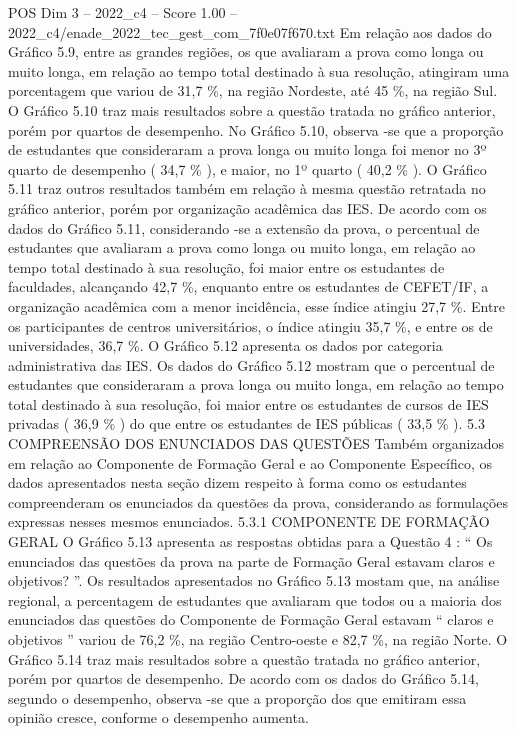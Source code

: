 \begin{textsample}{POS Dim 3 – 2022\_c4 – Score 1.00 – 2022\_c4/enade\_2022\_tec\_gest\_com\_7f0e07f670.txt}
Em relação aos dados do Gráfico 5.9, entre as grandes regiões, os que avaliaram a prova como longa ou muito longa, em relação ao tempo total destinado à sua resolução, atingiram uma porcentagem que variou de 31,7 \%, na região Nordeste, até 45 \%, na região Sul.
O Gráfico 5.10 traz mais resultados sobre a questão tratada no gráfico anterior, porém por quartos de desempenho.
No Gráfico 5.10, observa -se que a proporção de estudantes que consideraram a prova longa ou muito longa foi menor no 3º quarto de desempenho ( 34,7 \% ), e maior, no 1º quarto ( 40,2 \% ).
O Gráfico 5.11 traz outros resultados também em relação à mesma questão retratada no gráfico anterior, porém por organização acadêmica das IES.
De acordo com os dados do Gráfico 5.11, considerando -se a extensão da prova, o percentual de estudantes que avaliaram a prova como longa ou muito longa, em relação ao tempo total destinado à sua resolução, foi maior entre os estudantes de faculdades, alcançando 42,7 \%, enquanto entre os estudantes de CEFET/IF, a organização acadêmica com a menor incidência, esse índice atingiu 27,7 \%.
Entre os participantes de centros universitários, o índice atingiu 35,7 \%, e entre os de universidades, 36,7 \%.
O Gráfico 5.12 apresenta os dados por categoria administrativa das IES.
Os dados do Gráfico 5.12 mostram que o percentual de estudantes que consideraram a prova longa ou muito longa, em relação ao tempo total destinado à sua resolução, foi maior entre os estudantes de cursos de IES privadas ( 36,9 \% ) do que entre os estudantes de IES públicas ( 33,5 \% ). 5.3 COMPREENSÃO DOS ENUNCIADOS DAS QUESTÕES Também organizados em relação ao Componente de Formação Geral e ao Componente Específico, os dados apresentados nesta seção dizem respeito à forma como os estudantes compreenderam os enunciados da questões da prova, considerando as formulações expressas nesses mesmos enunciados. 5.3.1 COMPONENTE DE FORMAÇÃO GERAL O Gráfico 5.13 apresenta as respostas obtidas para a Questão 4 : “ Os enunciados das questões da prova na parte de Formação Geral estavam claros e objetivos? ”.
Os resultados apresentados no Gráfico 5.13 mostam que, na análise regional, a percentagem de estudantes que avaliaram que todos ou a maioria dos enunciados das questões do Componente de Formação Geral estavam “ claros e objetivos ” variou de 76,2 \%, na região Centro-oeste e 82,7 \%, na região Norte.
O Gráfico 5.14 traz mais resultados sobre a questão tratada no gráfico anterior, porém por quartos de desempenho.
De acordo com os dados do Gráfico 5.14, segundo o desempenho, observa -se que a proporção dos que emitiram essa opinião cresce, conforme o desempenho aumenta.

\end{textsample}
